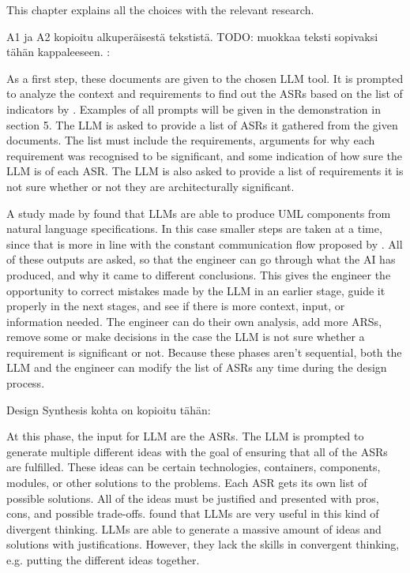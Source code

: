 This chapter explains all the choices with the relevant research.

A1 ja A2 kopioitu alkuperäisestä tekstistä. TODO: muokkaa teksti sopivaksi tähän kappaleeseen. :

As a first step, these documents are given to the chosen LLM tool. It is prompted to analyze the context and requirements to find out the ASRs based on the list of indicators by \textcite{chenCharacterizingArchitecturallySignificant2013}. Examples of all prompts will be given in the demonstration in section 5. The LLM is asked to provide a list of ASRs it gathered from the given documents. The list must include the requirements, arguments for why each requirement was recognised to be significant, and some indication of how sure the LLM is of each ASR. The LLM is also asked to provide a list of requirements it is not sure whether or not they are architecturally significant.

A study made by \textcite{tagliaferroLeveragingLLMsAutomate2025} found that LLMs are able to produce UML components from natural language specifications. In this case smaller steps are taken at a time, since that is more in line with the constant communication flow proposed by \textcite{terragniFutureAIDrivenSoftware2025}. All of these outputs are asked, so that the engineer can go through what the AI has produced, and why it came to different conclusions. This gives the engineer the opportunity to correct mistakes made by the LLM in an earlier stage, guide it properly in the next stages, and see if there is more context, input, or information needed. The engineer can do their own analysis, add more ARSs, remove some or make decisions in the case the LLM is not sure whether a requirement is significant or not. Because these phases aren't sequential, both the LLM and the engineer can modify the list of ASRs any time during the design process.

Design Synthesis kohta on kopioitu tähän:

At this phase, the input for LLM are the ASRs. The LLM is prompted to generate multiple different ideas with the goal of ensuring that all of the ASRs are fulfilled. These ideas can be certain technologies, containers, components, modules, or other solutions to the problems. Each ASR gets its own list of possible solutions. All of the ideas must be justified and presented with pros, cons, and possible trade-offs. \textcite{cervantesLLMsAssistantsSoftware2026} found that LLMs are very useful in this kind of divergent thinking. LLMs are able to generate a massive amount of ideas and solutions with justifications. However, they lack the skills in convergent thinking, e.g. putting the different ideas together.

